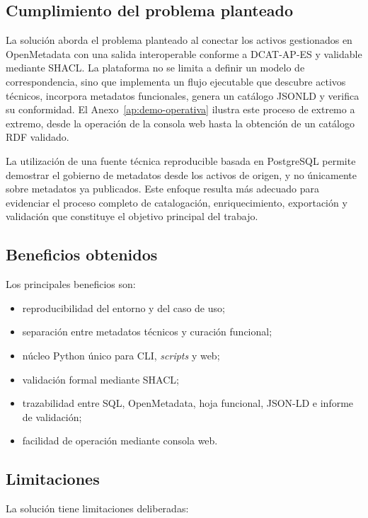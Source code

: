 \subsection{Cumplimiento del problema planteado}

La solución aborda el problema planteado al conectar los activos gestionados en OpenMetadata con una salida interoperable conforme a DCAT-AP-ES y validable mediante \ac{SHACL}. La plataforma no se limita a definir un modelo de correspondencia, sino que implementa un flujo ejecutable que descubre activos técnicos, incorpora metadatos funcionales, genera un catálogo \ac{JSONLD} y verifica su conformidad. El Anexo~\ref{ap:demo-operativa} ilustra este proceso de extremo a extremo, desde la operación de la consola web hasta la obtención de un catálogo \ac{RDF} validado.

La utilización de una fuente técnica reproducible basada en PostgreSQL permite demostrar el gobierno de metadatos desde los activos de origen, y no únicamente sobre metadatos ya publicados. Este enfoque resulta más adecuado para evidenciar el proceso completo de catalogación, enriquecimiento, exportación y validación que constituye el objetivo principal del trabajo.

\subsection{Beneficios obtenidos}

Los principales beneficios son:

\begin{itemize}
  \item reproducibilidad del entorno y del caso de uso;
  \item separación entre metadatos técnicos y curación funcional;
  \item núcleo Python único para CLI, \emph{scripts} y web;
  \item validación formal mediante SHACL;
  \item trazabilidad entre SQL, OpenMetadata, hoja funcional, JSON-LD e informe de validación;
  \item facilidad de operación mediante consola web.
\end{itemize}

\subsection{Limitaciones}

La solución tiene limitaciones deliberadas:

